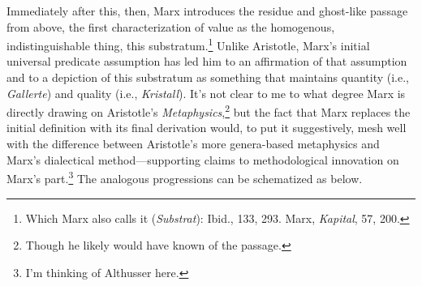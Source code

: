 \documentclass[12pt]{article}
\begin{document}
\noindent Immediately after this, then, Marx introduces the residue and ghost-like passage from above, the first characterization of value as the homogenous, indistinguishable thing, this substratum.\footnote{Which Marx also calls it (\textit{Substrat}): Ibid., 133, 293. Marx, \textit{Kapital}, 57, 200.} Unlike Aristotle, Marx's initial universal predicate assumption has led him to an affirmation of that assumption and to a depiction of this substratum as something that maintains quantity (i.e., \textit{Gallerte}) and quality (i.e., \textit{Kristall}). It's not clear to me to what degree Marx is directly drawing on Aristotle's \textit{Metaphysics},\footnote{Though he likely would have known of the passage.} but the fact that Marx replaces the initial definition with its final derivation would, to put it suggestively, mesh well with the difference between Aristotle's more genera-based metaphysics and Marx's dialectical method---supporting claims to methodological innovation on Marx's part.\footnote{I'm thinking of Althusser here.} The analogous progressions can be schematized as below.
\end{document}
